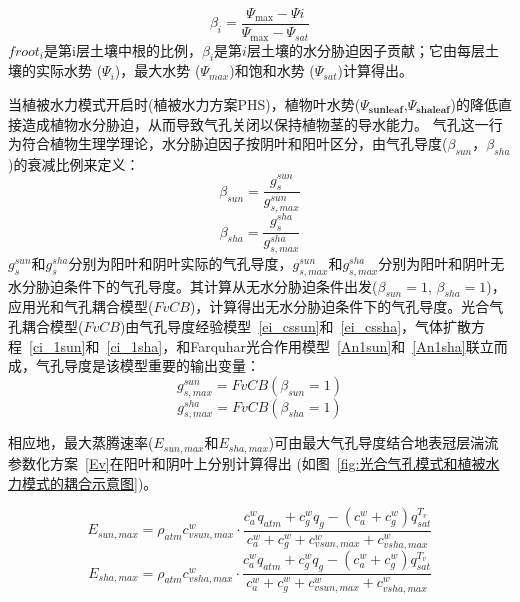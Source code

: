 \begin{equation}\label{beta_i}
\beta_{i}=\frac{\Psi_{\max }-\Psi i}{\Psi_{\max }-\Psi_{s a t}}
\end{equation}
$froot_i$是第i层土壤中根的比例，$\beta_i$是第$i$层土壤的水分胁迫因子贡献；它由每层土壤的实际水势 (${\Psi}_i$)，最大水势 (${\Psi}_{max}$)和饱和水势 (${\Psi}_{sat}$)计算得出。

当植被水力模式开启时(植被水力方案PHS)，植物叶水势($\Psi_{\mathbf{sunleaf}}$,$\Psi_{\mathbf{shaleaf}}$)的降低直接造成植物水分胁迫，从而导致气孔关闭以保持植物茎的导水能力。
气孔这一行为符合植物生理学理论，水分胁迫因子按阴叶和阳叶区分，由气孔导度($\beta_{sun}$，$\beta_{sha}$)的衰减比例来定义：
\begin{equation}\label{beta_sun}
\beta_{sun}=\frac{g_{s}^{sun}}{g_{s,max}^{sun}}
\end{equation}
\begin{equation}\label{beta_sha}
\beta_{sha}=\frac{g_{s}^{sha}}{g_{s,max}^{sha}}
\end{equation}
$g_{s}^{sun}$和$g_{s}^{sha}$分别为阳叶和阴叶实际的气孔导度，$g_{s,max}^{sun}$和$g_{s,max}^{sha}$分别为阳叶和阴叶无水分胁迫条件下的气孔导度。其计算从无水分胁迫条件出发($\beta_{sun}=1$, $\beta_{sha}=1$)，应用光和气孔耦合模型($FvCB$)，计算得出无水分胁迫条件下的气孔导度。光合气孔耦合模型($FvCB$)由气孔导度经验模型~\eqref{ei_cssun}和~\eqref{ei_cssha}，气体扩散方程~\eqref{ci_1sun}和~\eqref{ci_1sha}，和Farquhar光合作用模型~\eqref{An1sun}和~\eqref{An1sha}联立而成，气孔导度是该模型重要的输出变量：
\begin{equation}\label{gs_sunmax}
g_{s,max}^{sun}=FvCB\left(\beta_{sun}=1\right)
\end{equation}
\begin{equation}\label{gs_shamax}
g_{s,max}^{sha}=FvCB\left(\beta_{sha}=1\right)
\end{equation}


相应地，最大蒸腾速率($E_{sun,max}$和$E_{sha,max}$)可由最大气孔导度结合地表冠层湍流参数化方案~\eqref{Ev}在阳叶和阴叶上分别计算得出 (如图~\ref{fig:光合气孔模式和植被水力模式的耦合示意图})。

\begin{equation}\label{E_sunmax}
E_{sun,max}=\rho_{atm} c_{vsun,max}^{w} \cdot \frac{c_{a}^{w} q_{atm}+c_{g}^{w} q_{g}-
\left(c_{a}^{w}+c_{g}^{w}\right) q_{s a t}^{T_{v}}}{c_{a}^{w}+c_{g}^{w}+c_{vsun,max}^{w}+c_{vsha,max}^{w}}
\end{equation}
%
\begin{equation}\label{Eshamax}
E_{sha,max}=\rho_{atm} c_{vsha,max}^{w} \cdot \frac{c_{a}^{w} q_{atm}+c_{g}^{w} q_{g}-
\left(c_{a}^{w}+c_{g}^{w}\right) q_{s a t}^{T_{v}}}{c_{a}^{w}+c_{g}^{w}+c_{vsun,max}^{w}+c_{vsha,max}^{w}}
\end{equation}


